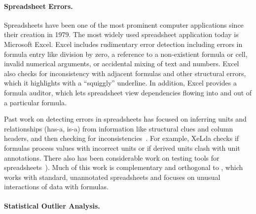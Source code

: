 \paragraph{Spreadsheet Errors.}
Spreadsheets have been one of the most prominent computer applications
since their creation in 1979.
 The most widely used spreadsheet application today is Microsoft
Excel. Excel includes rudimentary error detection including errors in
formula entry like division by zero, a reference to a non-existient
formula or cell, invalid numerical arguments, or accidental mixing of
text and numbers.
Excel also checks for inconsistency with adjacent formulas and other
structural errors, which it highlights with a ``squiggly'' underline. In addition, Excel provides a formula auditor, which lets spreadsheet view dependencies flowing into and out of a particular formula.

Past work on detecting errors in spreadsheets has focused on inferring
units and relationships (has-a, is-a) from information like structural
clues and column
headers, and then checking for inconsistencies~\cite{Antoniu:2004:VUC:998675.999448,DBLP:conf/kbse/AhmadAGK03,Chambers:2010:RSL:1860134.1860346,Erwig:2009:SES:1608570.1608694,Erwig:2005:AGM:1062455.1062494}. For
example, XeLda checks if formulas process values with incorrect units
or if derived units clash with unit annotations. There also has been
considerable work on testing tools for
spreadsheets~\cite{fisher2006scaling,rothermel1998you,rothermel2001methodology,Carver:2006:EET:1159733.1159775}). Much
of this work is complementary and orthogonal to \checkcell{}, which
works with standard, unannotated spreadsheets and focuses on unusual
interactions of data with formulas.



\paragraph{Statistical Outlier Analysis.}

